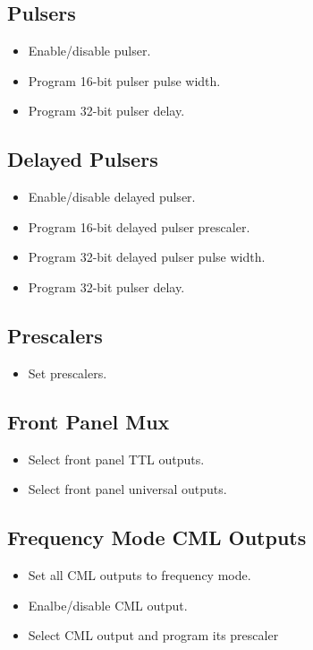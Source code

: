 \documentclass[a4paper,10pt]{article}
\begin{document}
	\subsection{Pulsers}
	\begin{itemize}
		\item Enable/disable pulser.
		\item Program 16-bit pulser pulse width.
		\item Program 32-bit pulser delay.
	\end{itemize}

	\subsection{Delayed Pulsers}
	\begin{itemize}
		\item Enable/disable delayed pulser.
		\item Program 16-bit delayed pulser prescaler.
		\item Program 32-bit delayed pulser pulse width.
		\item Program 32-bit pulser delay.
	\end{itemize}

	\subsection{Prescalers}
	\begin{itemize}
		\item Set prescalers.
	\end{itemize}

	\subsection{Front Panel Mux}
	\begin{itemize}
		\item Select front panel TTL outputs.
		\item Select front panel universal outputs.
	\end{itemize}

	\subsection{Frequency Mode CML Outputs}
	\begin{itemize}
		\item Set all CML outputs to frequency mode.
		\item Enalbe/disable CML output.
		\item Select CML output and program its prescaler
	\end{itemize}
\end{document}
